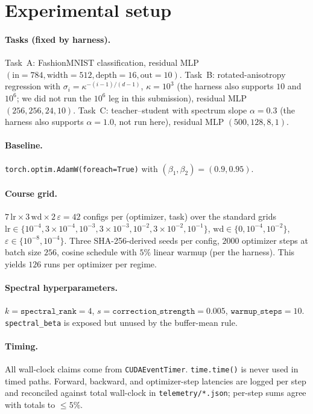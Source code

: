 \documentclass{article}
\begin{document}
\section{Experimental setup}

\paragraph{Tasks (fixed by harness).}
Task~A: Fashion\-MNIST classification, residual MLP
$(\text{in}=784,\text{width}=512,\text{depth}=16,\text{out}=10)$.
Task~B: rotated-anisotropy regression with $\sigma_i =
\kappa^{-(i-1)/(d-1)}$, $\kappa=10^3$ (the harness also supports
$10$ and $10^6$; we did not run the $10^6$ leg in this submission),
residual MLP $(256,256,24,10)$.
Task~C: teacher--student with spectrum slope $\alpha=0.3$ (the
harness also supports $\alpha=1.0$, not run here), residual MLP
$(500,128,8,1)$.

\paragraph{Baseline.}
\texttt{torch.optim.AdamW(foreach=True)} with
$(\beta_1,\beta_2)=(0.9,0.95)$.

\paragraph{Course grid.}
$7\,\text{lr}\times3\,\text{wd}\times2\,\varepsilon = 42$ configs per
(optimizer, task) over the standard grids
$\text{lr}\in\{10^{-4}, 3\!\times\!10^{-4}, 10^{-3}, 3\!\times\!10^{-3},
10^{-2}, 3\!\times\!10^{-2}, 10^{-1}\}$,
$\text{wd}\in\{0, 10^{-4}, 10^{-2}\}$,
$\varepsilon\in\{10^{-8}, 10^{-4}\}$.
Three SHA-256-derived seeds per config, $2000$ optimizer steps at
batch size $256$, cosine schedule with $5\%$ linear warmup (per the
harness).  This yields $126$ runs per optimizer per regime.

\paragraph{Spectral hyperparameters.}
$k=\texttt{spectral\_rank}=4$,
$s=\texttt{correction\_strength}=0.005$,
$\texttt{warmup\_steps}=10$.  \texttt{spectral\_beta} is exposed but
unused by the buffer-mean rule.

\paragraph{Timing.}
All wall-clock claims come from \texttt{CUDAEventTimer}.
\texttt{time.time()} is never used in timed paths.  Forward,
backward, and optimizer-step latencies are logged per step and
reconciled against total wall-clock in
\texttt{telemetry/*.json}; per-step sums agree with totals to
$\le 5\%$.
\end{document}
